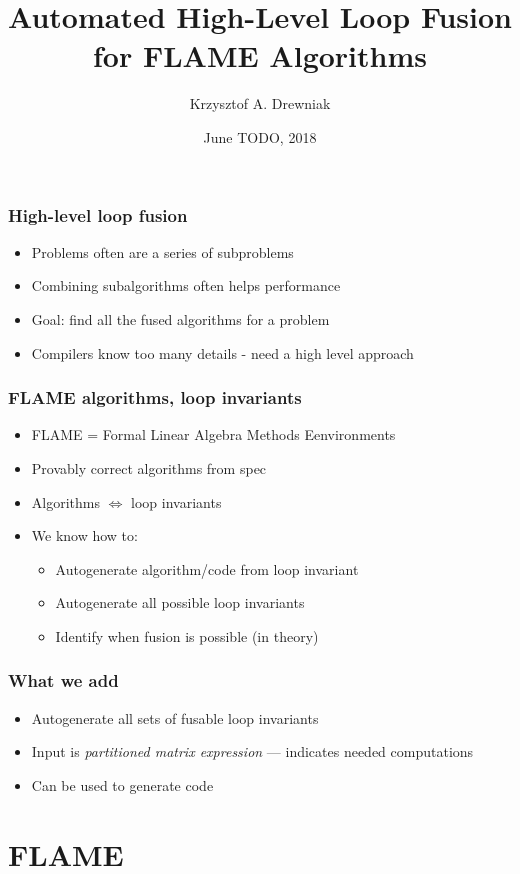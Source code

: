 \documentclass{beamer}
\title[Loop fusion]{Automated High-Level Loop Fusion for FLAME Algorithms}
\author[Drewniak]{Krzysztof A. Drewniak}
\institute[CMU]{Carnegie Mellon University}
\date[]{June TODO, 2018}
\begin{document}
\begin{frame}[plain]
  \titlepage{}
\end{frame}

\begin{frame}
  \frametitle{High-level loop fusion}
  \begin{itemize}
  \item Problems often are a series of subproblems
  \item Combining subalgorithms often helps performance
  \item Goal: find all the fused algorithms for a problem
  \item Compilers know too many details - need a high level approach
  \end{itemize}
\end{frame}

\begin{frame}
  \frametitle{FLAME algorithms, loop invariants}
  \begin{itemize}
  \item FLAME = Formal Linear Algebra Methods Eenvironments
  \item Provably correct algorithms from spec
  \item Algorithms $\Leftrightarrow$ loop invariants
  \item We know how to:
    \begin{itemize}
    \item Autogenerate algorithm/code from loop invariant
    \item Autogenerate all possible loop invariants
    \item Identify when fusion is possible (in theory)
    \end{itemize}
  \end{itemize}
\end{frame}

\begin{frame}
  \frametitle{What we add}
  \begin{itemize}
  \item Autogenerate all sets of fusable loop invariants
  \item Input is \emph{partitioned matrix expression} --- indicates needed computations
  \item Can be used to generate code
  \end{itemize}
\end{frame}

\section*{FLAME}
\end{document}
